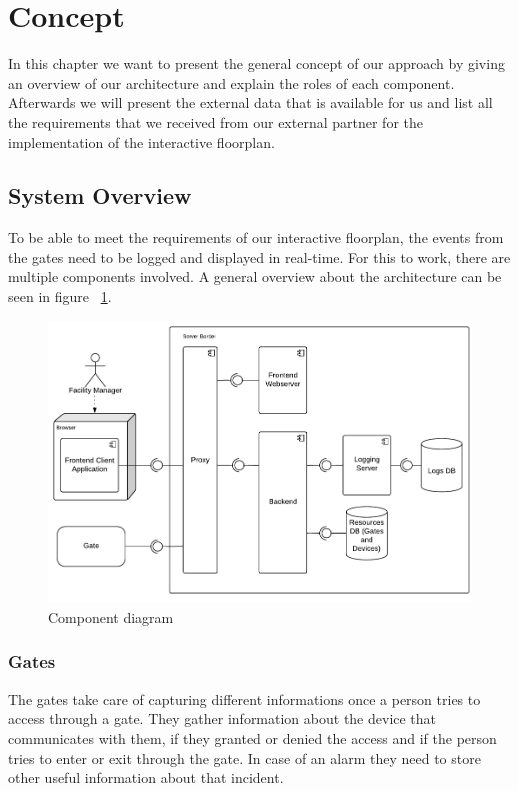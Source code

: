 \section{Concept}

In this chapter we want to present the general concept of our approach by giving an overview of our architecture and explain the roles of each component. Afterwards we will present the external data that is available for us and list all the requirements that we received from our external partner for the implementation of the interactive floorplan.

\subsection{System Overview}

To be able to meet the requirements of our interactive floorplan, the events from the gates need to be logged and displayed in real-time. For this to work, there are multiple components involved. A general overview about the architecture can be seen in figure ~\ref{fig:Komponentendiagramm}.

\begin{figure}[!hb]
	\centering
	\includegraphics[width=1\linewidth]{images/Komponentendiagramm}
	\caption{Component diagram}
	\label{fig:Komponentendiagramm}
\end{figure}

\subsubsection{Gates}
\label{Gates}

The gates take care of capturing different informations once a person tries to access through a gate. They gather information about the device that communicates with them, if they granted or denied the access and if the person tries to enter or exit through the gate. In case of an alarm they need to store other useful information about that incident.

